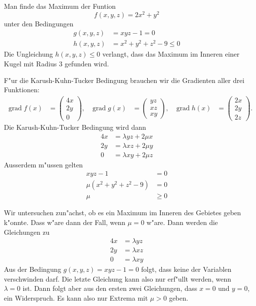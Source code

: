 \begin{beispiel}
Man finde das Maximum der Funtion
\[
f(x,y,z)=2x^2 + y^2
\]
unter den Bedingungen
\begin{align*}
g(x,y,z)&=xyz-1=0
\\
h(x,y,z)&=x^2+y^2+z^2-9 \le 0
\end{align*}
Die Ungleichung $h(x,y,z)\le 0$ verlangt, dass das Maximum
im Inneren einer Kugel mit Radius $3$ gefunden wird.

\medskip
F"ur die Karush-Kuhn-Tucker Bedingung brauchen wir die
Gradienten aller drei Funktionen:
\begin{align*}
\operatorname{grad}f(x)
&=
\begin{pmatrix}4x\\2y\\0\end{pmatrix},
&
\operatorname{grad}g(x)
&=
\begin{pmatrix}yz\\xz\\xy\end{pmatrix},
&
\operatorname{grad}h(x)
&=
\begin{pmatrix}2x\\2y\\2z\end{pmatrix}.
\end{align*}
Die Karush-Kuhn-Tucker Bedingung wird dann
\begin{align*}
4x&=\lambda yz+2\mu x
\\
2y&=\lambda xz+2\mu y
\\
0&=\lambda xy + 2 \mu z
\end{align*}
Ausserdem m"ussen gelten
\begin{align*}
xyz-1&=0\\
\mu(x^2+y^2+z^2-9)&=0\\
\mu&\ge 0
\end{align*}

Wir untersuchen zun"achst, ob es ein Maximum im Inneren des Gebietes
geben k"onnte. Dass w"are dann der Fall, wenn $\mu=0$ w"are. Dann
werden die Gleichungen zu
\begin{align*}
4x&=\lambda yz
\\
2y&=\lambda xz
\\
0&=\lambda xy
\end{align*}
Aus der Bedingung $g(x,y,z)=xyz-1=0$ folgt, dass keine der Variablen
verschwinden darf. Die letzte Gleichung kann also nur erf"ullt werden,
wenn $\lambda = 0$ ist. Dann folgt aber aus den ersten zwei Gleichungen,
dass $x=0$ und $y=0$, ein Widerspruch.
Es kann also nur Extrema mit $\mu >0$ geben.


\end{beispiel}
